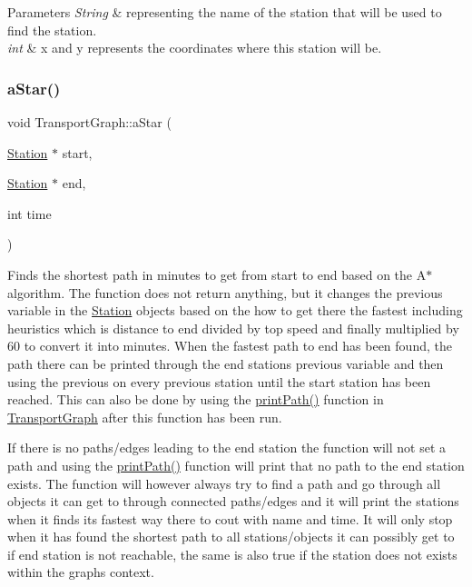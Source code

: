 \begin{DoxyParams}{Parameters}
{\em String} & representing the name of the station that will be used to find the station. \\
\hline
{\em int} & x and y represents the coordinates where this station will be. \\
\hline
\end{DoxyParams}
\mbox{\label{class_transport_graph_a2272ac3ddfd7efee405d36d44108037d}} 
\subsubsection{\texorpdfstring{aStar()}{aStar()}}
{\footnotesize\ttfamily void Transport\+Graph\+::a\+Star (\begin{DoxyParamCaption}\item[{\mbox{\hyperlink{class_station}{Station}} $\ast$}]{start,  }\item[{\mbox{\hyperlink{class_station}{Station}} $\ast$}]{end,  }\item[{int}]{time }\end{DoxyParamCaption})}

Finds the shortest path in minutes to get from start to end based on the A$\ast$ algorithm. The function does not return anything, but it changes the previous variable in the \mbox{\hyperlink{class_station}{Station}} objects based on the how to get there the fastest including heuristics which is distance to end divided by top speed and finally multiplied by 60 to convert it into minutes. When the fastest path to end has been found, the path there can be printed through the end stations previous variable and then using the previous on every previous station until the start station has been reached. This can also be done by using the \mbox{\hyperlink{class_transport_graph_adcd1d4c8068b5b524cbd323061caf068}{print\+Path()}} function in \mbox{\hyperlink{class_transport_graph}{Transport\+Graph}} after this function has been run.

If there is no paths/edges leading to the end station the function will not set a path and using the \mbox{\hyperlink{class_transport_graph_adcd1d4c8068b5b524cbd323061caf068}{print\+Path()}} function will print that no path to the end station exists. The function will however always try to find a path and go through all objects it can get to through connected paths/edges and it will print the stations when it finds its fastest way there to cout with name and time. It will only stop when it has found the shortest path to all stations/objects it can possibly get to if end station is not reachable, the same is also true if the station does not exists within the graphs context.

